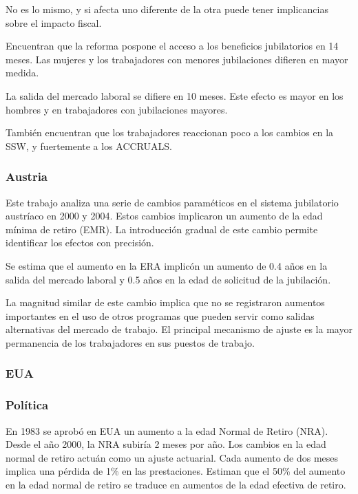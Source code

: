 \documentclass[]{article}
\begin{document}
No es lo mismo, y si afecta uno diferente de la otra puede tener
implicancias sobre el impacto fiscal.

Encuentran que la reforma pospone el acceso a los beneficios
jubilatorios en 14 meses. Las mujeres y los trabajadores con menores
jubilaciones difieren en mayor medida.

La salida del mercado laboral se difiere en 10 meses. Este efecto es
mayor en los hombres y en trabajadores con jubilaciones mayores.

También encuentran que los trabajadores reaccionan poco a los cambios en
la SSW, y fuertemente a los ACCRUALS.

\hypertarget{austria}{%
\subsubsection{Austria}\label{austria}}

Este trabajo analiza una serie de cambios paraméticos en el sistema
jubilatorio austríaco en 2000 y 2004. Estos cambios implicaron un
aumento de la edad mínima de retiro (EMR). La introducción gradual de
este cambio permite identificar los efectos con precisión.

Se estima que el aumento en la ERA implicón un aumento de 0.4 años en la
salida del mercado laboral y 0.5 años en la edad de solicitud de la
jubilación.

La magnitud similar de este cambio implica que no se registraron
aumentos importantes en el uso de otros programas que pueden servir como
salidas alternativas del mercado de trabajo. El principal mecanismo de
ajuste es la mayor permanencia de los trabajadores en sus puestos de
trabajo.

\hypertarget{eua}{%
\subsubsection{EUA}\label{eua}}

\hypertarget{poluxedtica}{%
\subsubsection{Política}\label{poluxedtica}}

En 1983 se aprobó en EUA un aumento a la edad Normal de Retiro (NRA).
Desde el año 2000, la NRA subiría 2 meses por año. Los cambios en la
edad normal de retiro actuán como un ajuste actuarial. Cada aumento de
dos meses implica una pérdida de 1\% en las prestaciones. Estiman que el
50\% del aumento en la edad normal de retiro se traduce en aumentos de
la edad efectiva de retiro.
\end{document}
